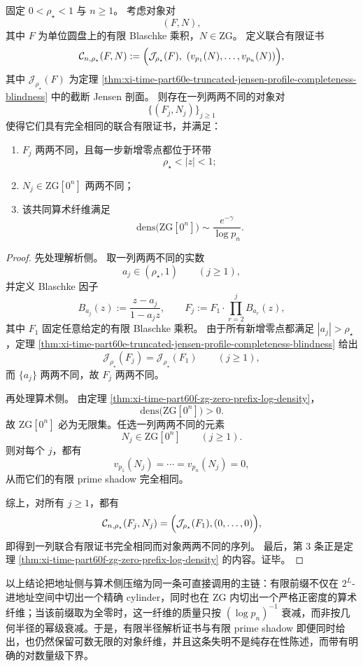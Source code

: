 \begin{theorem}\label{thm:xi-time-part60f-finite-radius-primeshadow-unified-strong-blindness}
固定 \(0<\rho_\star<1\) 与 \(n\ge 1\)。
考虑对象对
\[
(F,N),
\]
其中 \(F\) 为单位圆盘上的有限 Blaschke 乘积，\(N\in \mathrm{ZG}\)。
定义联合有限证书
\[
\mathcal C_{n,\rho_\star}(F,N)
:=
\Bigl(
\mathcal J_{\rho_\star}(F),\ 
(v_{p_1}(N),\dots,v_{p_n}(N))
\Bigr),
\]
其中 \(\mathcal J_{\rho_\star}(F)\) 为定理
\ref{thm:xi-time-part60e-truncated-jensen-profile-completeness-blindness}
中的截断 Jensen 剖面。
则存在一列两两不同的对象对
\[
\{(F_j,N_j)\}_{j\ge 1}
\]
使得它们具有完全相同的联合有限证书，并满足：
\begin{enumerate}
  \item \(F_j\) 两两不同，且每一步新增零点都位于环带
  \[
  \rho_\star<|z|<1;
  \]
  \item \(N_j\in \mathrm{ZG}[0^n]\) 两两不同；
  \item 该共同算术纤维满足
  \[
  \mathrm{dens}\bigl(\mathrm{ZG}[0^n]\bigr)
  \sim
  \frac{e^{-\gamma}}{\log p_n}.
  \]
\end{enumerate}
\end{theorem}
\begin{proof}
先处理解析侧。
取一列两两不同的实数
\[
a_j\in(\rho_\star,1)
\qquad(j\ge 1),
\]
并定义 Blaschke 因子
\[
B_{a_j}(z):=\frac{z-a_j}{1-a_j z},
\qquad
F_j:=F_1\cdot \prod_{r=2}^{j}B_{a_r}(z),
\]
其中 \(F_1\) 固定任意给定的有限 Blaschke 乘积。
由于所有新增零点都满足 \(|a_j|>\rho_\star\)，定理
\ref{thm:xi-time-part60e-truncated-jensen-profile-completeness-blindness}
给出
\[
\mathcal J_{\rho_\star}(F_j)=\mathcal J_{\rho_\star}(F_1)
\qquad(j\ge 1),
\]
而 \(\{a_j\}\) 两两不同，故 \(F_j\) 两两不同。

再处理算术侧。
由定理 \ref{thm:xi-time-part60f-zg-zero-prefix-log-density}，
\[
\mathrm{dens}\bigl(\mathrm{ZG}[0^n]\bigr)>0.
\]
故 \(\mathrm{ZG}[0^n]\) 必为无限集。任选一列两两不同的元素
\[
N_j\in \mathrm{ZG}[0^n]
\qquad(j\ge 1).
\]
则对每个 \(j\)，都有
\[
v_{p_1}(N_j)=\cdots=v_{p_n}(N_j)=0,
\]
从而它们的有限 prime shadow 完全相同。

综上，对所有 \(j\ge 1\)，都有
\[
\mathcal C_{n,\rho_\star}(F_j,N_j)
=
\Bigl(\mathcal J_{\rho_\star}(F_1),(0,\dots,0)\Bigr),
\]
即得到一列联合有限证书完全相同而对象两两不同的序列。
最后，第 \(3\) 条正是定理 \ref{thm:xi-time-part60f-zg-zero-prefix-log-density} 的内容。证毕。
\end{proof}

\noindent
以上结论把地址侧与算术侧压缩为同一条可直接调用的主链：有限前缀不仅在 \(2^L\)-进地址空间中切出一个精确 cylinder，同时也在 \(\mathrm{ZG}\) 内切出一个严格正密度的算术纤维；当该前缀取为全零时，这一纤维的质量只按 \((\log p_n)^{-1}\) 衰减，而非按几何半径的幂级衰减。于是，有限半径解析证书与有限 prime shadow 即便同时给出，也仍然保留可数无限的对象纤维，并且这条失明不是纯存在性陈述，而带有明确的对数量级下界。

\endinput

